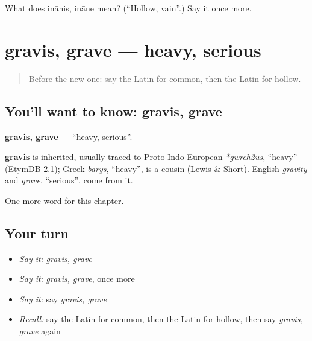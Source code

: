 \begin{tcolorbox}[breakable,colback=teal!4,colframe=teal!35!black,title={Before you move on}]
What does inānis, ināne mean? (\textquotedblleft{}Hollow, vain\textquotedblright{}.) Say it once more.
\end{tcolorbox}
\section[gravis, grave]{gravis, grave — heavy, serious}

\label{lesson:LA-C182-gravis}



\begin{quote}
Before the new one: say the Latin for common, then the Latin for hollow.
\end{quote}

\subsection*{You'll want to know: gravis, grave}
\textbf{gravis, grave} — \textquotedblleft{}heavy, serious\textquotedblright{}.

\begin{cousinweb}
\textbf{gravis} is inherited, usually traced to Proto-Indo-European \emph{*gwreh2us}, \textquotedblleft{}heavy\textquotedblright{} (EtymDB 2.1); Greek \emph{barys}, \textquotedblleft{}heavy\textquotedblright{}, is a cousin (Lewis \& Short). English \emph{gravity} and \emph{grave}, \textquotedblleft{}serious\textquotedblright{}, come from it.
\end{cousinweb}

\begin{grammarlens}[title={What you've built}]
One more word for this chapter.
\end{grammarlens}

\subsection*{Your turn}
\begin{itemize}
\raggedright
  \item \emph{Say it:} \emph{gravis, grave}
  \item \emph{Say it:} \emph{gravis, grave}, once more
  \item \emph{Say it:} say \emph{gravis, grave}
  \item \emph{Recall:} say the Latin for common, then the Latin for hollow, then say \emph{gravis, grave} again
\end{itemize}

